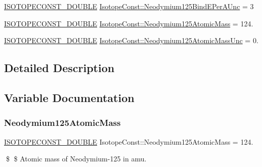 \begin{DoxyCompactItemize}
\mbox{\hyperlink{group___isotope_const-_macros_ga8f45a7272ce02c0b4c65c44636ed719a}{I\+S\+O\+T\+O\+P\+E\+C\+O\+N\+S\+T\+\_\+\+D\+O\+U\+B\+LE}} \mbox{\hyperlink{group___isotope_const-_neodymium-_nd125_ga3475600f9425b6a93ed4f266ff93727d}{Isotope\+Const\+::\+Neodymium125\+Bind\+E\+Per\+A\+Unc}} = 3
\item 
\mbox{\hyperlink{group___isotope_const-_macros_ga8f45a7272ce02c0b4c65c44636ed719a}{I\+S\+O\+T\+O\+P\+E\+C\+O\+N\+S\+T\+\_\+\+D\+O\+U\+B\+LE}} \mbox{\hyperlink{group___isotope_const-_neodymium-_nd125_ga782928ff09eb461c70c66bd83831a7a9}{Isotope\+Const\+::\+Neodymium125\+Atomic\+Mass}} = 124.
\item 
\mbox{\hyperlink{group___isotope_const-_macros_ga8f45a7272ce02c0b4c65c44636ed719a}{I\+S\+O\+T\+O\+P\+E\+C\+O\+N\+S\+T\+\_\+\+D\+O\+U\+B\+LE}} \mbox{\hyperlink{group___isotope_const-_neodymium-_nd125_gadd371ba49927106642be3a5fb5e62ca8}{Isotope\+Const\+::\+Neodymium125\+Atomic\+Mass\+Unc}} = 0.
\end{DoxyCompactItemize}


\subsection{Detailed Description}


\subsection{Variable Documentation}
\mbox{\label{group___isotope_const-_neodymium-_nd125_ga782928ff09eb461c70c66bd83831a7a9}} 
\subsubsection{\texorpdfstring{Neodymium125\+Atomic\+Mass}{Neodymium125AtomicMass}}
{\footnotesize\ttfamily \mbox{\hyperlink{group___isotope_const-_macros_ga8f45a7272ce02c0b4c65c44636ed719a}{I\+S\+O\+T\+O\+P\+E\+C\+O\+N\+S\+T\+\_\+\+D\+O\+U\+B\+LE}} Isotope\+Const\+::\+Neodymium125\+Atomic\+Mass = 124.}

\$ \$ Atomic mass of Neodymium-\/125 in amu. \mbox{\label{group___isotope_const-_neodymium-_nd125_gadd371ba49927106642be3a5fb5e62ca8}} 
